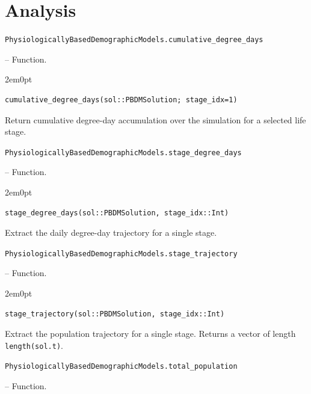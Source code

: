 \section{Analysis}



\label{18035618408509520877}{}

\hypertarget{13418563391845431489}{\texttt{PhysiologicallyBasedDemographicModels.cumulative\_degree\_days}}  -- {Function.}

\begin{adjustwidth}{2em}{0pt}


\begin{verbatim}
cumulative_degree_days(sol::PBDMSolution; stage_idx=1)
\end{verbatim}

Return cumulative degree-day accumulation over the simulation for a selected life stage.



\end{adjustwidth}
\hypertarget{2891182613627226290}{\texttt{PhysiologicallyBasedDemographicModels.stage\_degree\_days}}  -- {Function.}

\begin{adjustwidth}{2em}{0pt}


\begin{verbatim}
stage_degree_days(sol::PBDMSolution, stage_idx::Int)
\end{verbatim}

Extract the daily degree-day trajectory for a single stage.



\end{adjustwidth}
\hypertarget{7440887660900964622}{\texttt{PhysiologicallyBasedDemographicModels.stage\_trajectory}}  -- {Function.}

\begin{adjustwidth}{2em}{0pt}


\begin{verbatim}
stage_trajectory(sol::PBDMSolution, stage_idx::Int)
\end{verbatim}

Extract the population trajectory for a single stage. Returns a vector of length \texttt{length(sol.t)}.



\end{adjustwidth}
\hypertarget{11410472589670250776}{\texttt{PhysiologicallyBasedDemographicModels.total\_population}}  -- {Function.}

